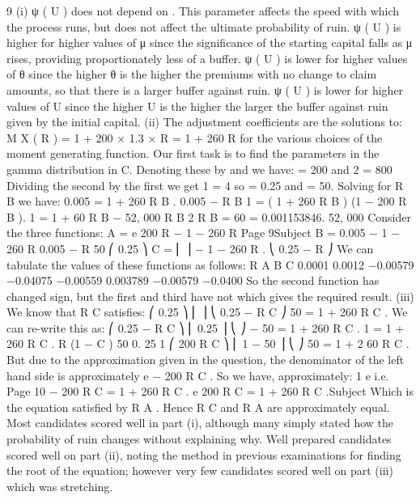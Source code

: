 9
(i)
ψ ( U )
does not depend on \lambda . This parameter affects the speed with which
the process runs, but does not affect the ultimate probability of ruin.
ψ ( U ) is higher for higher values of μ since the significance of the starting
capital falls as μ rises, providing proportionately less of a buffer.
ψ ( U ) is lower for higher values of θ since the higher θ is the higher the
premiums with no change to claim amounts, so that there is a larger buffer
against ruin.
ψ ( U ) is lower for higher values of U since the higher U is the higher the
larger the buffer against ruin given by the initial capital.
(ii)
The adjustment coefficients are the solutions to:
M X ( R ) = 1 + 200 × 1.3 × R = 1 + 260 R
for the various choices of the moment generating function.
Our first task is to find the parameters in the gamma distribution in C.
Denoting these by \alpha and \beta we have:
\alpha
\alpha
= 200 and 2 = 800
\beta
\beta
Dividing the second by the first we get 1 = 4 so \beta = 0.25 and \alpha = 50.
\beta
Solving for R B we have:
0.005
= 1 + 260 R B .
0.005 − R B
1 = ( 1 + 260 R B ) (1 − 200 R B ).
1 = 1 + 60 R B − 52, 000 R B 2
R B =
60
= 0.001153846.
52, 000
Consider the three functions:
A = e 200 R − 1 − 260 R
Page 9Subject %
B =
0.005
− 1 − 260 R
0.005 − R
50
⎛ 0.25 ⎞
C = ⎜
⎟ − 1 − 260 R .
⎝ 0.25 − R ⎠
We can tabulate the values of these functions as follows:
R A B C
0.0001
0.0012 −0.00579
−0.04075 −0.00559
0.003789 −0.00579
−0.0400
So the second function has changed sign, but the first and third have not which
gives the required result.
(iii)
We know that R C satisfies:
⎛ 0.25 ⎞
⎜
⎟
⎝ 0.25 − R C ⎠
50
= 1 + 260 R C .
We can re-write this as:
⎛ 0.25 − R C ⎞
⎜ 0.25 ⎟
⎝
⎠
− 50
= 1 + 260 R C .
1
= 1 + 260 R C .
R
(1 − C ) 50
0. 25
1
⎛ 200 R C ⎞
⎜ 1 − 50 ⎟
⎝
⎠
50
= 1 + 2 60 R C .
But due to the approximation given in the question, the denominator of the left
hand side is approximately e − 200 R C .
So we have, approximately:
1
e
i.e.
Page 10
− 200 R C
= 1 + 260 R C .
e 200 R C = 1 + 260 R C .Subject %
Which is the equation satisfied by R A . Hence R C and R A are approximately
equal.
Most candidates scored well in part (i), although many simply stated how the probability of
ruin changes without explaining why. Well prepared candidates scored well on part (ii),
noting the method in previous examinations for finding the root of the equation; however very
few candidates scored well on part (iii) which was stretching.
